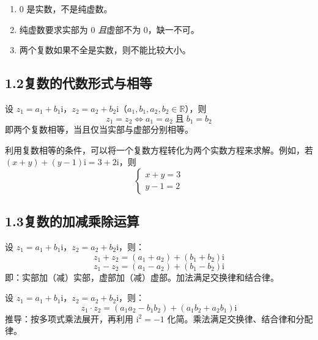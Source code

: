 \documentclass[12pt, a4paper]{ctexart}
\begin{document}
\begin{warnbox}[易错提醒]
\begin{enumerate}[leftmargin=2em]
  \item $0$ 是实数，不是纯虚数。
  \item 纯虚数要求实部为 $0$ \emph{且}虚部不为 $0$，缺一不可。
  \item 两个复数如果不全是实数，则不能比较大小。
\end{enumerate}
\end{warnbox}

\subsection*{1.2\quad 复数的代数形式与相等}

\begin{knowledgebox}[复数相等的条件]
设 $z_1 = a_1 + b_1\mathrm{i}$，$z_2 = a_2 + b_2\mathrm{i}$（$a_1, b_1, a_2, b_2 \in \mathbb{R}$），则
\[
  z_1 = z_2 \iff a_1 = a_2 \;\text{且}\; b_1 = b_2
\]
即两个复数相等，当且仅当实部与虚部分别相等。
\end{knowledgebox}

\begin{tipbox}[规律]
利用复数相等的条件，可以将一个复数方程转化为两个实数方程来求解。例如，若 $(x + y) + (y - 1)\mathrm{i} = 3 + 2\mathrm{i}$，则
\[
\begin{cases} x + y = 3 \\ y - 1 = 2 \end{cases}
\]
\end{tipbox}

\subsection*{1.3\quad 复数的加减乘除运算}

\begin{knowledgebox}[复数的加法与减法]
设 $z_1 = a_1 + b_1\mathrm{i}$，$z_2 = a_2 + b_2\mathrm{i}$，则：
\[
  z_1 + z_2 = (a_1 + a_2) + (b_1 + b_2)\mathrm{i}
\]
\[
  z_1 - z_2 = (a_1 - a_2) + (b_1 - b_2)\mathrm{i}
\]
即：实部加（减）实部，虚部加（减）虚部。加法满足交换律和结合律。
\end{knowledgebox}

\begin{knowledgebox}[复数的乘法]
设 $z_1 = a_1 + b_1\mathrm{i}$，$z_2 = a_2 + b_2\mathrm{i}$，则：
\[
  z_1 \cdot z_2 = (a_1 a_2 - b_1 b_2) + (a_1 b_2 + a_2 b_1)\mathrm{i}
\]
推导：按多项式乘法展开，再利用 $\mathrm{i}^2 = -1$ 化简。乘法满足交换律、结合律和分配律。
\end{knowledgebox}
\end{document}
